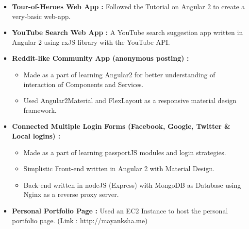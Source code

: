 
{\fontsize{11pt}{1em}\bodyfontlight\upshape\color{text}
  \begin{itemize}
			\item \textbf{Tour-of-Heroes Web App : } Followed the Tutorial on Angular 2 to create a very-basic web-app.
\item \textbf{YouTube Search Web App : } A YouTube search suggestion app written in Angular 2 using rxJS library with the YouTube API.
\item \textbf{Reddit-like Community App (anonymous posting) : } 
		\begin{itemize}
				\item Made as a part of learning Angular2 for better understanding of interaction of Components and Services.
				\item Used Angular2Material and FlexLayout as a responsive material design framework.
		\end{itemize}
\item \textbf{Connected Multiple Login Forms (Facebook, Google, Twitter \& Local logins) : } 
		\begin{itemize}
				\item Made as a part of learning passportJS modules and login strategies.
				\item Simplistic Front-end written in Angular 2 with Material Design.
				\item Back-end written in nodeJS (Express) with MongoDB as Database using Nginx as a reverse proxy server.
		\end{itemize}
\item \textbf{Personal Portfolio Page : } Used an EC2 Instance to host the personal portfolio page. 						(Link : http://mayanksha.me)
  \end{itemize}
}
